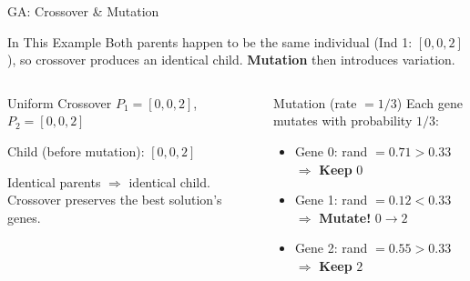 \documentclass[aspectratio=43,8pt]{beamer}
\begin{document}
\begin{frame}{GA: Crossover \& Mutation}
\begin{block}{In This Example}
Both parents happen to be the same individual (Ind 1: $[0, 0, 2]$), so crossover produces an identical child. \textbf{Mutation} then introduces variation.
\end{block}

\vspace{0.2cm}
\begin{columns}[t]
\begin{exampleblock}{Uniform Crossover}
$P_1 = [0, 0, 2]$, $P_2 = [0, 0, 2]$

\vspace{0.1cm}
Child (before mutation): $[0, 0, 2]$

\vspace{0.1cm}
{\footnotesize Identical parents $\Rightarrow$ identical child. Crossover preserves the best solution's genes.}
\end{exampleblock}

\begin{alertblock}{Mutation (rate $= 1/3$)}
Each gene mutates with probability $1/3$:
\begin{itemize}
    \item Gene 0: rand $= 0.71 > 0.33$ $\Rightarrow$ \textbf{Keep} $0$
    \item Gene 1: rand $= 0.12 < 0.33$ $\Rightarrow$ \textbf{Mutate!} $0 \to 2$
    \item Gene 2: rand $= 0.55 > 0.33$ $\Rightarrow$ \textbf{Keep} $2$
\end{itemize}
\end{alertblock}
\end{columns}

\vspace{0.3cm}
\begin{center}
\end{center}
\end{frame}
\end{document}

